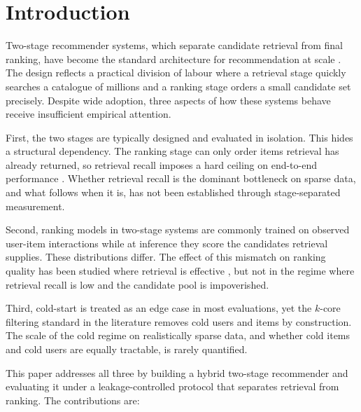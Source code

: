 \documentclass[10pt,twocolumn]{article}
\begin{document}
\section{Introduction}
\label{sec:intro}

Two-stage recommender systems, which separate candidate retrieval from final
ranking, have become the standard architecture for recommendation at scale
\citep{covington2016deep,huang2025survey}. The design reflects a practical
division of labour where a retrieval stage quickly searches a catalogue of
millions and a ranking stage orders a small candidate set precisely. Despite
wide adoption, three aspects of how these systems behave receive insufficient
empirical attention.

First, the two stages are typically designed and evaluated in isolation. This
hides a structural dependency. The ranking stage can only order items
retrieval has already returned, so retrieval recall imposes a hard ceiling on
end-to-end performance \citep{huang2025survey}. Whether retrieval recall is
the dominant bottleneck on sparse data, and what follows when it is, has not
been established through stage-separated measurement.

Second, ranking models in two-stage systems are commonly trained on observed
user-item interactions while at inference they score the candidates retrieval
supplies. These distributions differ. The effect of this mismatch on ranking
quality has been studied where retrieval is effective
\citep{kang2019candidate,zheng2024full}, but not in the regime where retrieval
recall is low and the candidate pool is impoverished.

Third, cold-start is treated as an edge case in most evaluations, yet the
$k$-core filtering standard in the literature removes cold users and items by
construction. The scale of the cold regime on realistically sparse data, and
whether cold items and cold users are equally tractable, is rarely quantified.

This paper addresses all three by building a hybrid two-stage recommender and
evaluating it under a leakage-controlled protocol that separates retrieval
from ranking. The contributions are:
\end{document}
